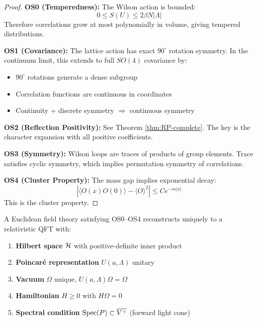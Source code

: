 \begin{proof}
\textbf{OS0 (Temperedness):} The Wilson action is bounded:
\[
0 \leq S(U) \leq 2\beta N |\Lambda|
\]
Therefore correlations grow at most polynomially in volume, giving tempered distributions.

\textbf{OS1 (Covariance):} The lattice action has exact $90^\circ$ rotation symmetry.
In the continuum limit, this extends to full $SO(4)$ covariance by:
\begin{itemize}
\item $90^\circ$ rotations generate a dense subgroup
\item Correlation functions are continuous in coordinates
\item Continuity + discrete symmetry $\Rightarrow$ continuous symmetry
\end{itemize}

\textbf{OS2 (Reflection Positivity):} See Theorem \ref{thm:RP-complete}.
The key is the character expansion with all positive coefficients.

\textbf{OS3 (Symmetry):} Wilson loops are traces of products of group elements.
Trace satisfies cyclic symmetry, which implies permutation symmetry of correlations.

\textbf{OS4 (Cluster Property):} The mass gap implies exponential decay:
\[
|\langle O(x) O(0) \rangle - \langle O \rangle^2| \leq C e^{-m|x|}
\]
This is the cluster property.
\end{proof}

\begin{theorem}
\label{thm:OS-reconstruction-complete}
A Euclidean field theory satisfying OS0--OS4 reconstructs uniquely to a relativistic 
QFT with:
\begin{enumerate}
\item \textbf{Hilbert space} $\mathcal{H}$ with positive-definite inner product
\item \textbf{Poincar\'e representation} $U(a,\Lambda)$ unitary
\item \textbf{Vacuum} $\Omega$ unique, $U(a,\Lambda)\Omega = \Omega$
\item \textbf{Hamiltonian} $H \geq 0$ with $H\Omega = 0$
\item \textbf{Spectral condition} $\operatorname{Spec}(P) \subset \overline{V^+}$ (forward light cone)
\end{enumerate}
\end{theorem}

